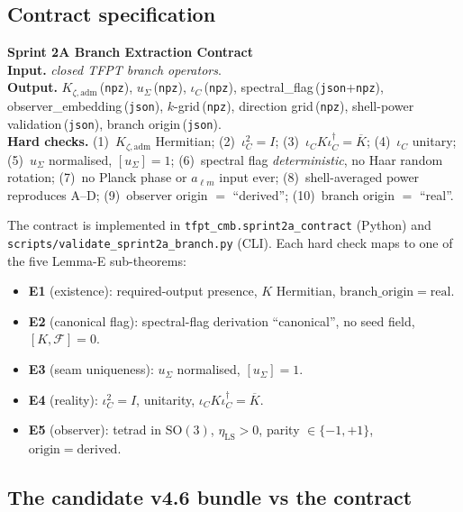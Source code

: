 \subsection{Contract specification}

\begin{tfptwarningbox}
\textbf{Sprint 2A Branch Extraction Contract}\\
\textbf{Input.} \emph{closed TFPT branch operators}.\\
\textbf{Output.}
\(K_{\zeta,\mathrm{adm}}\)\,(\texttt{npz}),
\(u_\Sigma\)\,(\texttt{npz}),
\(\iota_C\)\,(\texttt{npz}),
spectral\_flag\,(\texttt{json}+\texttt{npz}),
observer\_embedding\,(\texttt{json}),
\(k\)-grid\,(\texttt{npz}), direction grid\,(\texttt{npz}),
shell-power validation\,(\texttt{json}), branch origin\,(\texttt{json}).\\
\textbf{Hard checks.}
(1)~\(K_{\zeta,\mathrm{adm}}\) Hermitian;
(2)~\(\iota_C^2=I\);
(3)~\(\iota_C K \iota_C^\dagger=\overline{K}\);
(4)~\(\iota_C\) unitary;
(5)~\(u_\Sigma\) normalised, \([u_\Sigma]=1\);
(6)~spectral flag \emph{deterministic}, no Haar random rotation;
(7)~no Planck phase or \(a_{\ell m}\) input ever;
(8)~shell-averaged power reproduces A--D;
(9)~observer origin \(=\) ``derived'';
(10)~branch origin \(=\) ``real''.
\end{tfptwarningbox}

The contract is implemented in
\texttt{tfpt\_cmb.sprint2a\_contract} (Python) and
\texttt{scripts/validate\_sprint2a\_branch.py} (CLI).  Each hard check
maps to one of the five Lemma-E sub-theorems:
\begin{itemize}[leftmargin=1.4em]
\item \textbf{E1} (existence): required-output presence,
\(K\) Hermitian, \(\mathrm{branch\_origin}=\mathrm{real}\).
\item \textbf{E2} (canonical flag): spectral-flag derivation
``canonical'', no seed field, \([K, \mathcal F]=0\).
\item \textbf{E3} (seam uniqueness): \(u_\Sigma\) normalised,
\([u_\Sigma]=1\).
\item \textbf{E4} (reality): \(\iota_C^2=I\), unitarity,
\(\iota_C K \iota_C^\dagger=\overline{K}\).
\item \textbf{E5} (observer): tetrad in \(\mathrm{SO}(3)\),
\(\eta_{\mathrm{LS}}>0\), parity \(\in\{-1,+1\}\),
\(\mathrm{origin}=\mathrm{derived}\).
\end{itemize}

\subsection{The candidate v4.6 bundle vs the contract}

